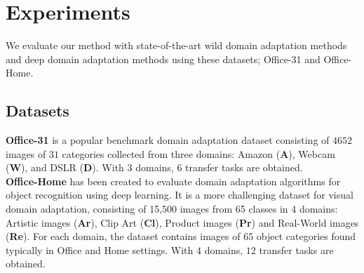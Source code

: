 \section{Experiments}
We evaluate our method with state-of-the-art wild domain adaptation methods and deep domain adaptation methods using these datasets; Office-31 and Office-Home.
\subsection{Datasets}
\label{sec:datasets}
\textbf{Office-31} \cite{office31} is a popular benchmark domain adaptation dataset consisting of $4652$ images of $31$ categories collected from three domains: Amazon (\textbf{A}), Webcam (\textbf{W}), and DSLR (\textbf{D}). With $3$ domains, $6$ transfer tasks are obtained.\\
\textbf{Office-Home} \cite{officehome} has been created to evaluate domain adaptation algorithms for object recognition using deep learning. It is a more challenging
dataset for visual domain adaptation, consisting of 15,500 images from 65 classes in 4 domains: Artistic images (\textbf{Ar}), Clip Art (\textbf{Cl}), Product images (\textbf{Pr}) and Real-World images (\textbf{Re}). For each domain, the dataset contains images of 65 object categories found typically in Office and Home settings. With $4$ domains, $12$ transfer tasks are obtained.\\

